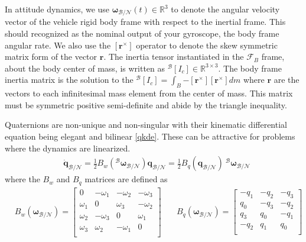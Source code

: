In attitude dynamics, we use $\bm{\omega}_{\mathcal{B/N}}(t) \in \mathbb{R}^3$ to denote the angular velocity vector of the vehicle rigid body frame with respect to the inertial frame. This should recognized as the nominal output of your gyroscope, the body frame angular rate. We also use the $\left[\mathbf{r}^\times \right]$ operator to denote the skew symmetric matrix form of the vector $\mathbf{r}$. The inertia tensor instantiated in the $\mathcal{F}_B$ frame, about the body center of mass, is written as $^\mathcal{B}[I_c] \in \mathbb{R}^{3\times 3}$. The body frame inertia matrix is the solution to the $^\mathcal{B}[I_c] = \int_B{-[\bm{r}^\times][\bm{r}^\times]dm} $ where $\bm{r}$ are the vectors to each infinitesimal mass element from the center of mass. This matrix must be symmetric positive semi-definite and abide by the triangle inequality.

Quaternions are non-unique and non-singular with their kinematic differential equation being elegant and bilinear \ref{qkde}. These can be attractive for problems where the dynamics are linearized.
% 
\begin{align}
\label{qkde}
 & \dot{\bm{q}}_{\mathcal{B/N}} = \frac{1}{2} B_w(^\mathcal{B}\bm{\omega}_{\mathcal{B/N}}) \bm{q}_{\mathcal{B/N}} = \frac{1}{2} B_q(\bm{q}_{\mathcal{B/N}}) \ ^\mathcal{B}\bm{\omega}_{\mathcal{B/N}}
\end{align}
% 
where the $B_w$ and $B_q$ matrices are defined as 
\begin{align}
& B_w(\bm{\omega}_{\mathcal{B/N}}) = 
	\begin{bmatrix}
	0 & -\omega_1 & -\omega_2 & -\omega_3\\ 
	\omega_1 & 0 & \omega_3 & -\omega_2 \\
	\omega_2 & -\omega_3 & 0 & \omega_1 \\
	\omega_3 & \omega_2 & -\omega_1  & 0  \\
	\end{bmatrix} \quad
& B_q(\bm{\omega}_{\mathcal{B/N}}) = 
	\begin{bmatrix}
	-q_1 & -q_2 & -q_3\\ 
	q_0 & -q_3 & -q_2 \\
	q_3 & q_0 & -q_1 \\
	-q_2 & q_1  & q_0  \\
	\end{bmatrix}
\end{align}


